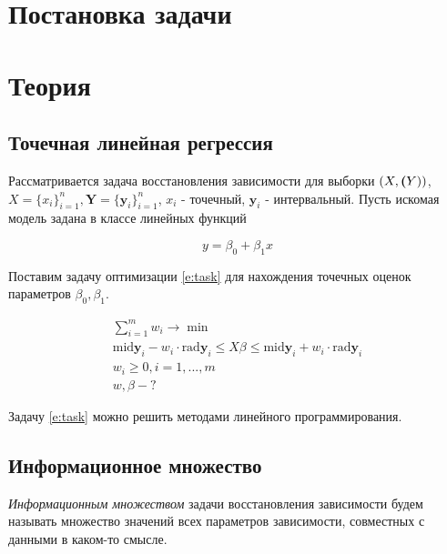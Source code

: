 \documentclass[a4paper,12pt]{article}
\begin{document}
    
    \newpage

    \tableofcontents
    \listoffigures
    \newpage

    \section{Постановка задачи}
    \section{Теория}
    \subsection{Точечная линейная регрессия}
    \quad Рассматривается задача восстановления зависимости для выборки
    $ (X, \textbf(Y))$, $ X = \{x_i\}_{i=1}^{n}, \textbf{Y} = \{\textbf{y}_i\}_{i=1}^{n} $,
    $ x_i $ - точечный, $ \textbf{y}_i $ - интервальный.
    Пусть искомая модель задана в классе линейных функций

    \label{e:model}
    \begin{equation}
        y = \beta_0 + \beta_1 x
    \end{equation}

    Поставим задачу оптимизации \ref{e:task} для нахождения точечных оценок
    параметров $ \beta_0, \beta_1 $.

    \label{e:task}
    \begin{equation}
        \begin{gathered}
            \sum_{i = 1}^{m}w_{i} \to \min \\
            \text{mid}\textbf{y}_{i} - w_{i} \cdot \text{rad}\textbf{y}_{i} \leq X\beta \leq \text{mid}\textbf{y}_{i} + w_{i} \cdot \text{rad}\textbf{y}_{i} \\
            w_{i} \geq 0, i = 1, ..., m \\
            w, \beta - ?
        \end{gathered}
    \end{equation}
    
    Задачу \ref{e:task} можно решить методами линейного программирования.

    \subsection{Информационное множество}
    \quad \textsl{Информационным множеством} задачи восстановления зависимости
    будем называть множество значений всех параметров зависимости,
    совместных с данными в каком-то смысле. 
\end{document}
